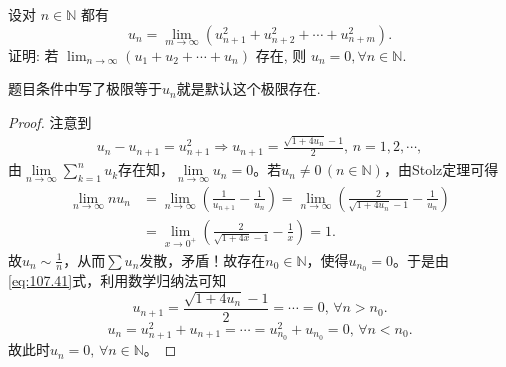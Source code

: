 \documentclass[../../main.tex]{subfiles}%
\begin{document}
\begin{example}
设对 \( n \in \mathbb{N} \) 都有
\[
u_n = \lim_{m \to \infty} (u_{n+1}^2 + u_{n+2}^2 + \cdots + u_{n+m}^2).
\]
证明: 若 \( \lim_{n \to \infty} (u_1 + u_2 + \cdots + u_n) \) 存在, 则 \( u_n = 0, \forall n \in \mathbb{N} \).
\end{example}
\begin{remark}
题目条件中写了极限等于$u_n$就是默认这个极限存在.
\end{remark}
\begin{proof}

注意到
\begin{align}
u_n - u_{n+1} = u_{n+1}^2 \Longrightarrow u_{n+1} = \frac{\sqrt{1 + 4u_n} - 1}{2}, \, n = 1, 2, \cdots, \label{eq:107.41}
\end{align}
由$\lim\limits_{n \to \infty} \sum_{k=1}^n u_k$存在知，$\lim\limits_{n \to \infty} u_n = 0$。若$u_n \neq 0 \, (n \in \mathbb{N})$，由Stolz定理可得
\begin{align*}
\lim_{n \to \infty} n u_n &= \lim_{n \to \infty} \left( \frac{1}{u_{n+1}} - \frac{1}{u_n} \right) = \lim_{n \to \infty} \left( \frac{2}{\sqrt{1 + 4u_n} - 1} - \frac{1}{u_n} \right) \\
&= \lim_{x \to 0^+} \left( \frac{2}{\sqrt{1 + 4x} - 1} - \frac{1}{x} \right) = 1.
\end{align*}
故$u_n \sim \frac{1}{n}$，从而$\sum u_n$发散，矛盾！故存在$n_0 \in \mathbb{N}$，使得$u_{n_0} = 0$。于是由\eqref{eq:107.41}式，利用数学归纳法可知
\[
u_{n+1} = \frac{\sqrt{1 + 4u_n} - 1}{2} = \cdots = 0, \, \forall n > n_0.
\]
\[
u_n = u_{n+1}^2 + u_{n+1} = \cdots = u_{n_0}^2 + u_{n_0} = 0, \, \forall n < n_0.
\]
故此时$u_n = 0, \, \forall n \in \mathbb{N}$。

\end{proof}
\end{document}
